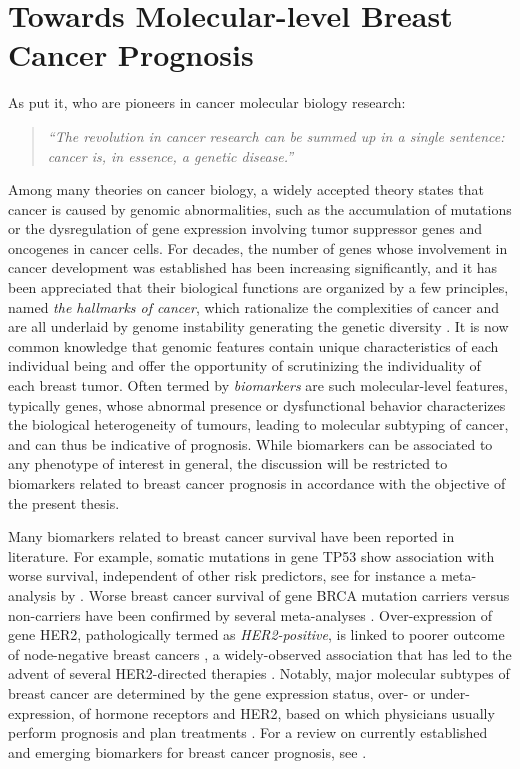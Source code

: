 \section{Towards Molecular-level Breast Cancer Prognosis}

As \cite{Vogelstein2004Cancer} put it, who are pioneers in cancer molecular biology research:
\begin{quotation}
	\it ``The revolution in cancer research can be summed up in a single sentence: cancer is, in essence, a genetic disease.''
\end{quotation}
Among many theories on cancer biology, a widely accepted theory states that cancer is caused by genomic abnormalities, such as the accumulation of mutations or the dysregulation of gene expression involving tumor suppressor genes and oncogenes in cancer cells. For decades, the number of genes whose involvement in cancer development was established has been increasing significantly, and it has been appreciated that their biological functions are organized by a few principles, named \textit{the hallmarks of cancer}, which rationalize the complexities of cancer and are all underlaid by genome instability generating the genetic diversity \cite{Hanahan2000hallmarks, Hanahan2011Hallmarks}. It is now common knowledge that genomic features contain unique characteristics of each individual being and offer the opportunity of scrutinizing the individuality of each breast tumor. Often termed by \textit{biomarkers} are such molecular-level features, typically genes, whose abnormal presence or dysfunctional behavior characterizes the biological heterogeneity of tumours, leading to molecular subtyping of cancer, and can thus be indicative of prognosis. While biomarkers can be associated to any phenotype of interest in general, the discussion will be restricted to biomarkers related to breast cancer prognosis in accordance with the objective of the present thesis.


Many biomarkers related to breast cancer survival have been reported in literature. For example, somatic mutations in gene TP53 show association with worse survival, independent of other risk predictors, see for instance a meta-analysis by \cite{Pharoah1999Somatic}. Worse breast cancer survival of gene BRCA mutation carriers versus non-carriers have been confirmed by several meta-analyses \cite{Zhong2015Effects, Zhu2016BRCA}. Over-expression of gene HER2, pathologically termed as \textit{HER2-positive}, is linked to poorer outcome of node-negative breast cancers \cite{Chia2008Human}, a widely-observed association that has led to the advent of several HER2-directed therapies \cite{Arteaga2012Treatment}. Notably, major molecular subtypes of breast cancer are determined by the gene expression status, over- or under-expression, of hormone receptors and HER2, based on which physicians usually perform prognosis and plan treatments \cite{Schnitt2010Classification}. For a review on currently established and emerging biomarkers for breast cancer prognosis, see \cite{Weigel2010Current}.



